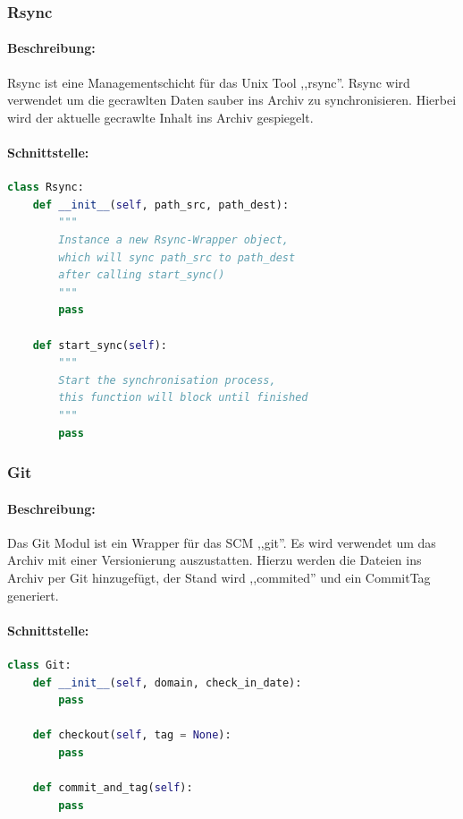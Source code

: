 
\subsubsection{Rsync}
\label{ssub:rsync}
\paragraph{Beschreibung:}
\label{par:beschreibung_}
Rsync ist eine Managementschicht für das Unix Tool ,,rsync''. Rsync wird verwendet um die gecrawlten Daten sauber ins Archiv zu synchronisieren.
Hierbei wird der aktuelle gecrawlte Inhalt ins Archiv gespiegelt. 

\paragraph{Schnittstelle:}
\label{par:schnittstelle_}
\begin{lstlisting}[language=python]
class Rsync:
    def __init__(self, path_src, path_dest):
        """
        Instance a new Rsync-Wrapper object,
        which will sync path_src to path_dest
        after calling start_sync() 
        """
        pass

    def start_sync(self):
        """
        Start the synchronisation process,
        this function will block until finished
        """
        pass
\end{lstlisting}

\subsubsection{Git}
\label{ssub:git}
\paragraph{Beschreibung:}
\label{par:beschreibung_}
Das Git Modul ist ein Wrapper für das SCM ,,git''. Es wird verwendet um das Archiv mit einer Versionierung auszustatten. Hierzu werden 
die Dateien ins Archiv per Git hinzugefügt, der Stand wird ,,commited'' und ein CommitTag generiert.

\paragraph{Schnittstelle:}
\label{par:schnittstelle_}
\begin{lstlisting}[language=python]
class Git:
    def __init__(self, domain, check_in_date):
        pass

    def checkout(self, tag = None):
        pass

    def commit_and_tag(self):
        pass
\end{lstlisting}

